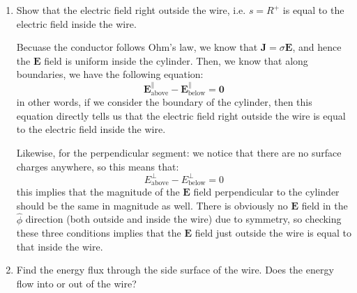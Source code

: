 \documentclass[10pt]{article}
\begin{document}
	\begin{enumerate}[label=(\alph*), resume]
		\item Show that the electric field right outside the wire, i.e. \( s = R^{+} \) is equal to the
			electric field inside the wire. 

			\begin{solution}
				Becuase the conductor follows Ohm's law, we know that \( \mathbf{J} = \sigma \mathbf{E} \),
				and hence the \( \mathbf{E} \) field is uniform inside the cylinder. Then, we know that
				along boundaries, we have the following equation:
				\[
					\mathbf{E}^{\parallel}_\text{above} - \mathbf{E}^{\parallel}_{\text{below}} = \mathbf{0}
				\]
				in other words, if we consider the boundary of the cylinder, then this equation directly 
				tells us that the electric field right outside the wire is equal to the electric field inside
				the wire. 

				Likewise, for the perpendicular segment: we notice that there are no surface charges anywhere, so
				this means that:
				\[
					E^{\perp}_\text{above} - E^{\perp}_\text{below} = 0
				\]
				this implies that the magnitude of the \( \mathbf{E} \) field perpendicular to the cylinder
				should be the same in magnitude as well. There is obviously no \( \mathbf{E}  \) field in the
				\( \hat{\phi} \) direction (both outside and inside the wire) due to symmetry, 
				so checking these three conditions implies that
				the \( \mathbf{E} \) field just outside the wire is equal to that inside the wire. 
			\end{solution}
		\item Find the energy flux through the side surface of the wire. Does the energy flow into or out of
			the wire?


\end{enumerate}
\end{document}
